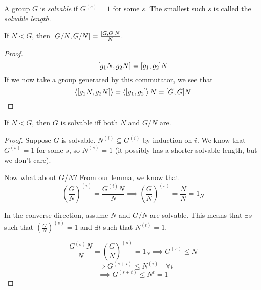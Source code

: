 \documentclass[a4paper,twoside,master.tex]{subfiles}
\begin{document}
\begin{definition}
    A group $ G $ is \textit{solvable} if $ G^{(s)} = 1 $ for some $ s $. The smallest such $ s $ is called the \textit{solvable length}.
\end{definition}

\begin{lemma}
    If $ N\triangleleft G $, then $ \comm{G/N}{G/N} = \frac{\comm{G}{G} N}{N} $.
\end{lemma}
\begin{proof}
    \begin{equation}
        \comm{g_1 N}{g_2 N} = \comm{g_1}{g_2} N
    \end{equation}
    If we now take a group generated by this commutator, we see that
    \begin{equation}
        \ev{\comm{g_1 N}{g_2 N}} = \ev{\comm{g_1}{g_2}} N = \comm{G}{G} N
    \end{equation}
\end{proof}

\begin{claim}
    If $ N \triangleleft G $, then $ G $ is solvable iff both $ N $ and $ G/N $ are.
\end{claim}

\begin{proof}
    Suppose $ G $ is solvable. $ N^{(i)} \subseteq G^{(i)} $ by induction on $ i $. We know that $ G^{(s)} = 1 $ for some $ s $, so $ N^{(s)} = 1 $ (it possibly has a shorter solvable length, but we don't care).

    Now what about $ G/N $? From our lemma, we know that
    \begin{equation}
        \left( \frac{G}{N} \right)^{(i)} = \frac{G^{(i)} N}{N} \implies \left( \frac{G}{N} \right)^{(s)} = \frac{N}{N} = 1_N
    \end{equation}


    In the converse direction, assume $ N $ and $ G/N $ are solvable. This means that $ \exists s $ such that $ \left( \frac{G}{N} \right)^{(s)} = 1 $ and $ \exists t $ such that $ N^{(t)} = 1 $. 

    \begin{equation}
        \frac{G^{(s)} N}{N} = \left( \frac{G}{N} \right)^{(s)} = 1_N \implies G^{(s)} \leq N
    \end{equation}
    \begin{equation}
        \implies G^{(s+i)} \leq N^{(i)} \quad\forall i
    \end{equation}
    \begin{equation}
        \implies G^{(s+t)} \leq N^{t} = 1
    \end{equation}
\end{proof}
\end{document}
